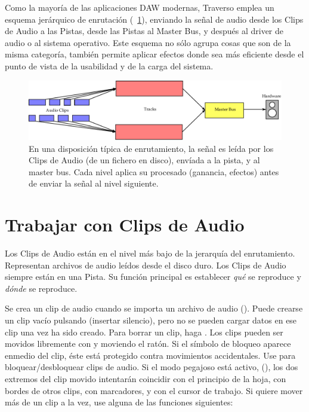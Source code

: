 ﻿Como la mayoría de las aplicaciones DAW modernas, Traverso emplea un esquema jerárquico de enrutación (\FigB~\ref{fig_routing01}), enviando la señal de audio desde los Clips de Audio a las Pistas, desde las Pistas al Master Bus, y después al driver de audio o al sistema operativo. Este esquema no sólo agrupa cosas que son de la misma categoría, también permite aplicar efectos donde sea más eficiente desde el punto de vista de la usabilidad y de la carga del sistema. 

\begin{figure}[t]
 \centering\includegraphics[width=\textwidth]{../images/routing1}
 \caption{En una disposición típica de enrutamiento, la señal es leída por los Clips de Audio (de un fichero en disco), envíada a la pista, y al master bus. Cada nivel aplica su procesado (ganancia, efectos) antes de enviar la señal al nivel siguiente.}
 \label{fig_routing01}
\end{figure}

\section{Trabajar con Clips de Audio}
Los Clips de Audio están en el nivel más bajo de la jerarquía del enrutamiento. Representan archivos de audio leídos desde el disco duro. Los Clips de Audio siempre están en una Pista. Su función principal es establecer \emph{qué} se reproduce y \emph{dónde} se reproduce.

Se crea un clip de audio cuando se importa un archivo de audio (). Puede crearse un clip vacío pulsando  (insertar silencio), pero no se pueden cargar datos en ese clip una vez ha sido creado. Para borrar un clip, haga . Los clips pueden ser movidos libremente con  y moviendo el ratón. Si el símbolo de bloqueo aparece enmedio del clip, éste está protegido contra movimientos accidentales. Use  para bloquear/desbloquear clips de audio. Si el modo pegajoso está activo, (), los dos extremos del clip movido intentarán coincidir con el principio de la hoja, con bordes de otros clips, con marcadores, y con el cursor de trabajo. Si quiere mover más de un clip a la vez, use alguna de las funciones siguientes:

